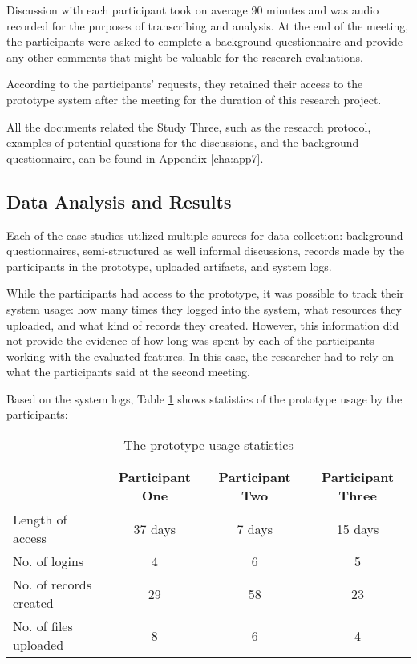 Discussion with each participant took on average 90 minutes and was audio
recorded for the purposes of transcribing and analysis. At the end of the
meeting, the participants were asked to complete a background questionnaire and
provide any other comments that might be valuable for the research evaluations.

According to the participants' requests, they retained their access to the
prototype system after the meeting for the duration of this research project.

All the documents related the Study Three, such as the research protocol,
examples of potential questions for the discussions, and the background
questionnaire, can be found in Appendix \ref{cha:app7}.

\subsection{Data Analysis and Results}

Each of the case studies utilized multiple sources for data collection:
background questionnaires, semi-structured as well informal discussions, records
made by the participants in the prototype, uploaded artifacts, and system logs.

While the participants had access to the prototype, it was possible to track
their system usage: how many times they logged into the system, what resources
they uploaded, and what kind of records they created. However, this information
did not provide the evidence of how long was spent by each of the participants
working with the evaluated features. In this case, the researcher had to rely on
what the participants said at the second meeting.

Based on the system logs, Table \ref{tab:study3stats} shows statistics of the
prototype usage by the participants:

\begin{table}[htb] \small
\setlength{\abovecaptionskip}{0pt}
\caption{The prototype usage statistics}
\begin{center}
	\begin{tabular} {| p{3.5cm} | c | c | c |}
	 \hline
	 \multicolumn{1}{|c|}{} &
     \multicolumn{1}{c|}{\textbf{Participant One}} & 
     \multicolumn{1}{c|}{\textbf{Participant Two}} & 
     \multicolumn{1}{c|}{\textbf{Participant Three}} \\ \hline
	    Length of access\footnotemark[1] & 37 days & 7 days & 15 days \\ \hline 
	    No. of logins & 4 & 6 & 5 \\ \hline 
	    No. of records created & 29 & 58 & 23 \\ \hline
	    No. of files uploaded & 8 & 6 & 4 \\ \hline
	\end{tabular}
\end{center}
\label{tab:study3stats}
\end{table}


